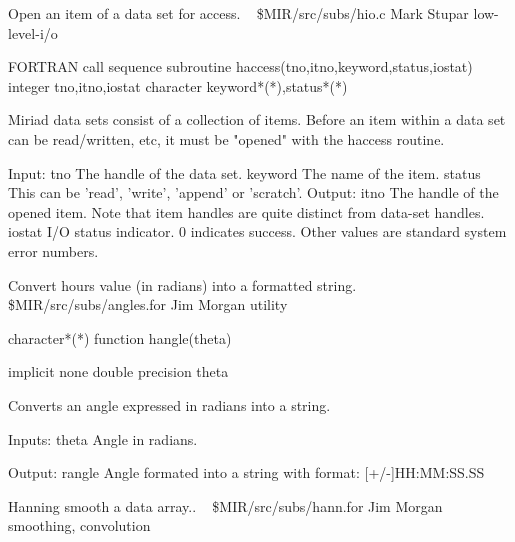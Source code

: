 %
\noindent Open an item of a data set for access.
\newline \ 
\newline {} \$MIR/src/subs/hio.c
\newline {} Mark Stupar
\newline {} low-level-i/o
\par{\tenpoint
{\eightpoint\begintt
FORTRAN call sequence
        subroutine haccess(tno,itno,keyword,status,iostat)
        integer tno,itno,iostat
        character keyword*(*),status*(*)

  Miriad data sets consist of a collection of items. Before an item within
  a data set can be read/written, etc, it must be "opened" with the haccess
  routine.

  Input:
    tno         The handle of the data set.
    keyword     The name of the item.
    status      This can be 'read', 'write', 'append' or 'scratch'.
  Output:
    itno        The handle of the opened item. Note that item handles are
                quite distinct from data-set handles.
   iostat       I/O status indicator. 0 indicates success. Other values
                are standard system error numbers.                      
\endtt}
\par}
%
\noindent Convert hours value (in radians) into a formatted string.
\newline \ 
\newline \abox{File:} \$MIR/src/subs/angles.for
\newline {} Jim Morgan
\newline \abox{Keywords:} utility
\par{\tenpoint
{\eightpoint\begintt
      character*(*) function hangle(theta)

      implicit none
      double precision theta

  Converts an angle expressed in radians into a string.

  Inputs:
    theta    Angle in radians.

  Output:
    rangle   Angle formated into a string with format:
               [+/-]HH:MM:SS.SS
\endtt}
\par}
%
\noindent Hanning smooth a data array..
\newline \ 
\newline {} \$MIR/src/subs/hann.for
\newline \abox{Responsible:} Jim Morgan
\newline {} smoothing, convolution
